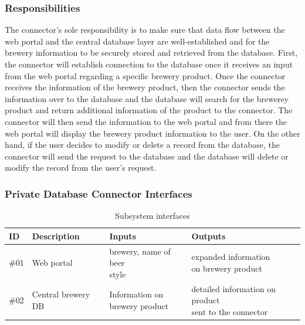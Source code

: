 \subsubsection{Responsibilities}
The connector's sole responsibility is to make sure that data flow between the web portal and the central database layer are well-established and for the brewery information to be securely stored and retrieved from the database.  First, the connector will establish connection to the database once it receives an input from the web portal regarding a specific brewery product.  Once the connector receives the information of the brewery product, then the connector sends the information over to the database and the database will search for the brewerey product and return additional information of the product to the connector.  The connector will then send the information to the web portal and from there the web portal will display the brewery product information to the user.
On the other hand, if the user decides to modify or delete a record from the database, the connector will send the request to the database and the database will delete or modify the record from the user's request.

\subsubsection{Private Database Connector Interfaces}

\begin {table}[H]
\caption {Subsystem interfaces} 
\begin{center}
    \begin{tabular}{ | p{1cm} | p{6cm} | p{3cm} | p{3cm} |}
    \hline
    ID & Description & Inputs & Outputs \\ \hline
    \#01 & Web portal & \pbox{3cm}{brewery, name of beer \\ style} & \pbox{3cm}{expanded information \\ on brewery product}  \\ \hline
    \#02 & Central brewery DB & \pbox{3cm}{Information on \\ brewery product} & \pbox{3cm}{detailed information on product \\ sent to the connector}  \\ \hline
    \end{tabular}
\end{center}
\end{table}
